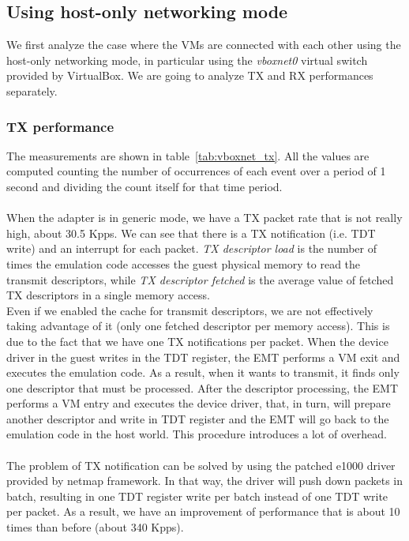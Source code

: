 \documentclass[a4paper, 12pt, titlepage]{report}
\begin{document}
\subsection{Using host-only networking mode}
We first analyze the case where the VMs are connected with each other using the host-only networking mode, in particular using the \textit{vboxnet0} virtual switch provided by VirtualBox. We are going to analyze TX and RX performances separately.
\subsubsection{TX performance}
The measurements are shown in table~\ref{tab:vboxnet_tx}. All the values are computed counting the number of occurrences of each event over a period of 1 second and dividing the count itself for that time period.
\\
\\
When the adapter is in generic mode, we have a TX packet rate that is not really high, about 30.5 Kpps. We can see that there is a TX notification (i.e. TDT write) and an interrupt for each packet. \textit{TX descriptor load} is the number of times the emulation code accesses the guest physical memory to read the transmit descriptors, while \textit{TX descriptor fetched} is the average value of fetched TX descriptors in a single memory access.
\\
Even if we enabled the cache for transmit descriptors, we are not effectively taking advantage of it (only one fetched descriptor per memory access). This is due to the fact that we have one TX notifications per packet. When the device driver in the guest writes in the TDT register, the EMT performs a VM exit and executes the emulation code. As a result, when it wants to transmit, it finds only one descriptor that must be processed. After the descriptor processing, the EMT performs a VM entry and executes the device driver, that, in turn, will prepare another descriptor and write in TDT register and the EMT will go back to the emulation code in the host world. This procedure introduces a lot of overhead.
\\
\\
The problem of TX notification can be solved by using the patched e1000 driver provided by netmap framework. In that way, the driver will push down packets in batch, resulting in one TDT register write per batch instead of one TDT write per packet. As a result, we have an improvement of performance that is about 10 times than before (about 340 Kpps).
\end{document}
